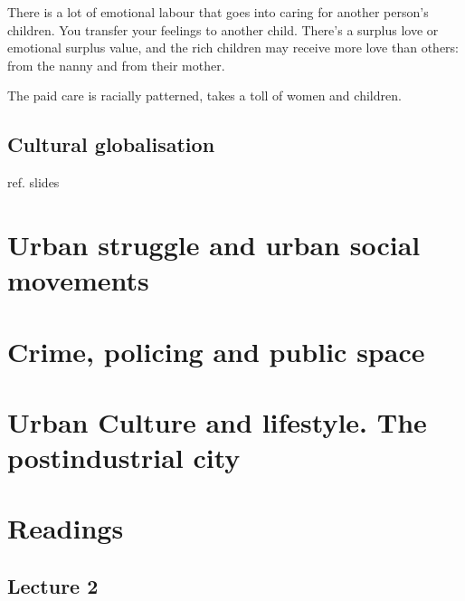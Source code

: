 \documentclass{article}
\begin{document}
There is a lot of emotional labour that goes into caring for another person's children. You transfer your feelings to another child. There's a surplus love or emotional surplus value, and the rich children may receive more love than others: from the nanny and from their mother.

The paid care is racially patterned, takes a toll of women and children.

\subsection{Cultural globalisation}

ref. slides 

\begin{outline}
	\1
\end{outline}


\section{Urban struggle and urban social movements}
\date{September 28th, 2021}



\section{Crime, policing and public space}
\date{September 28th, 2021}


\section{Urban Culture and lifestyle. The postindustrial city}
\date{September 28th, 2021}


\section{Readings}

\subsection{Lecture 2}
\end{document}

